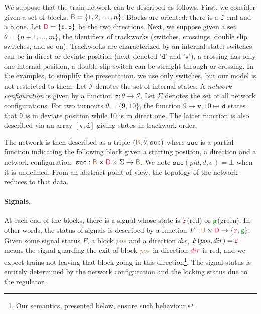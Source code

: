 \documentclass[runningheads]{llncs}
\newcommand{\directions}{\dirFmt{\mathsf{D}}}
\newcommand{\turnouts}{{\mathsf{\theta}}}
\newcommand{\blocks}{{\posFmt{\mathsf{B}}}}
\newcommand{\internalState}{{\mathcal{I}}}
\newcommand{\forward}{\ensuremath{\mathtt{f}}}
\newcommand{\backward}{\ensuremath{\mathtt{b}}}
\newcommand{\sucblock}{{\mathtt{suc}}}
\newcommand{\networkConf}{\ensuremath{\Sigma}}
\newcommand{\dirFmt}[1]{{\color{dircolor}{#1}}}
\newcommand{\posFmt}[1]{{\color{poscolor}{#1}}}
\newcommand{\sigred}{{\mbox{${\color{red!50!black}\mathtt{r}}$}}\xspace}
\newcommand{\siggreen}{{\mbox{${\color{green!50!black}\mathtt{g}}$}}\xspace}
\newcommand{\deviate}{{\mbox{$\mathtt{v}$}}\xspace}
\newcommand{\direct}{{\mbox{$\mathtt{d}$}}\xspace}
\begin{document}
We suppose that the train network can be described as follows. First, we consider given a set of blocks: $\blocks = \{ 1, 2, \ldots, n\}$. Blocks are oriented: there is a $\forward$ end and a $\backward$ one. Let $\directions = \{\forward, \backward\}$ be the two directions.  Next, we suppose given a set $\turnouts = \{ n+1, \ldots, m\}$, the identifiers  of trackworks (switches, crossings, double slip switches, and so on). Trackworks are characterized by an internal state: switches can be in direct or deviate position (next denoted '\direct' and '\deviate'), a crossing has only one internal position, a double slip switch can be straight through or crossing. In the examples, to simplify the presentation, we use only switches, but our model is not restricted to them.  Let $\internalState$ denotes the set of internal states. A \emph{network configuration} is given by a function $\sigma: \turnouts \to \internalState$. Let $\networkConf$ denotes the set of all network configurations. For two turnouts $\theta = \{9, 10\}$, the function $9 \mapsto \deviate, 10 \mapsto \direct$ states that $9$ is in deviate position while 10 is in direct one. The latter function is also described via an array  $[\deviate, \direct]$ giving states in trackwork order. 

The network is then described as a triple $(\blocks, \turnouts, \sucblock)$ where $\sucblock$ is a partial function indicating the following block given a starting position, a direction and a network configuration: $\sucblock: \blocks\times \directions \times \networkConf \to \blocks$. We note $\sucblock(pid, d, \sigma) = \bot$ when it is undefined. From an abstract point of view, the topology of the network reduces to that data.  


\paragraph{Signals.}

At each end of the blocks, there is a signal whose state is \sigred (red) or \siggreen (green). In other words, the status of signals is described by a function $F: \blocks \times \directions \to \{ \sigred, \siggreen\}$. Given some signal status $F$, a block $\posFmt{pos}$ and a direction $dir$, $F(pos,dir) = \sigred$ means the signal guarding the exit of block $\posFmt{pos}$ in direction $\dirFmt{dir}$ is red, and we expect trains not leaving that block going in this direction\footnote{Our semantics, presented below, ensure such behaviour.}. The signal status is entirely determined by the network configuration and the locking status due to the regulator.
\end{document}
